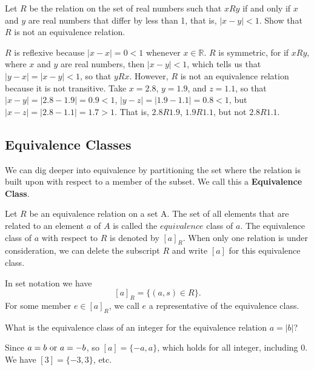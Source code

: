 \begin{example}
	Let \( R \) be the relation on the set of real numbers such that \( xRy \) if and only if \( x \) and \( y \) are real numbers that differ by less than 1, that is, \( |x - y| < 1 \). Show that \( R \) is not an equivalence relation.
\end{example}
\begin{solution}
	\( R \) is reflexive because \( |x - x| = 0 < 1 \) whenever \( x \in \mathbb{R} \). \( R \) is symmetric, for if \( xRy \), where \( x \) and \( y \) are real numbers, then \( |x - y| < 1 \), which tells us that \( |y - x| = |x - y| < 1 \), so that \( yRx \). However, \( R \) is not an equivalence relation because it is not transitive. Take \( x = 2.8 \), \( y = 1.9 \), and \( z = 1.1 \), so that \( |x - y| = |2.8 - 1.9| = 0.9 < 1 \), \( |y - z| = |1.9 - 1.1| = 0.8 < 1 \), but \( |x - z| = |2.8 - 1.1| = 1.7 > 1 \). That is, \( 2.8R1.9 \), \( 1.9R1.1 \), but not \( 2.8R1.1 \).
\end{solution}

\subsection{Equivalence Classes}
We can dig deeper into equivalence by partitioning the set where the relation is built upon with respect to a member of the subset. We call this a \textbf{Equivalence Class}. 

\begin{definition}
	Let $R$ be an equivalence relation on a set A. The set of all elements that are related to an element $a$ of $A$ is called the $equivalence$ class of $a$. The equivalence class of $a$ with respect to $R$ is denoted by $[a]_R$. When only one relation is under consideration, we can delete the subscript $R$ and write $[a]$ for this equivalence class.
\end{definition}
\begin{remark}
	In set notation we have $$[a]_R = \{ (a,s) \in R\}.$$ For some member $e\in [a]_R$, we call $e$ a representative of the equivalence class.
\end{remark}

\begin{example}
	What is the equivalence class of an integer for the equivalence relation $a = |b|$?
\end{example}
\begin{solution}
	Since $a = b \text{ or } a = -b$, so $[a] = \{-a,a\}$, which holds for all integer, including 0. We have $[3] = \{ -3, 3\}$, etc.
\end{solution}

